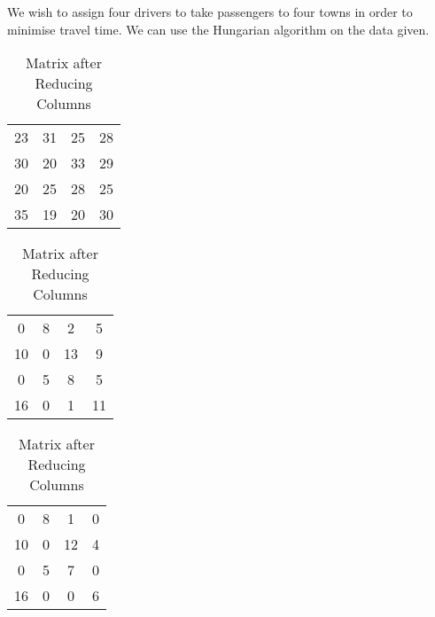 \begin{subquestions}
\begin{subsubquestions}
We wish to assign four drivers to take passengers to four towns in order to minimise travel time. We can use the Hungarian algorithm on the data given.
\begin{table}[H]
	\begin{minipage}{0.3\textwidth}
		\centering
		\begin{tabular}{cccc}
			23 & 31 & 25 & 28 \\
			30 & 20 & 33 & 29 \\
			20 & 25 & 28 & 25 \\
			35 & 19 & 20 & 30 \\
		\end{tabular}
		\captionsetup{width=1.1\linewidth}
		\caption*{Matrix From question}
	\end{minipage}
	\hspace{20pt}
	\begin{minipage}{0.3\textwidth}
		\centering
		\begin{tabular}{cccc}
			0 & 8 & 2 & 5 \\
		   10 & 0 & 13 & 9 \\
			0 & 5 & 8 & 5 \\
		   16 & 0 & 1 & 11 \\
		\end{tabular}
		\captionsetup{width=1.1\linewidth}
		\caption*{Matrix after Reducing Rows}
	\end{minipage}
	\hspace{20pt}
	\begin{minipage}{0.3\textwidth}
		\centering
		\begin{tabular}{cccc}
			0 & 8 & 1 & 0 \\
		   10 & 0 & 12 & 4 \\
			0 & 5 & 7 & 0 \\
		   16 & 0 & 0 & 6 \\
		\end{tabular}
		\captionsetup{width=1.1\linewidth}
		\caption*{Matrix after Reducing Columns} 
	\end{minipage}
	

\end{table}
\end{subsubquestions}
\end{subquestions}
